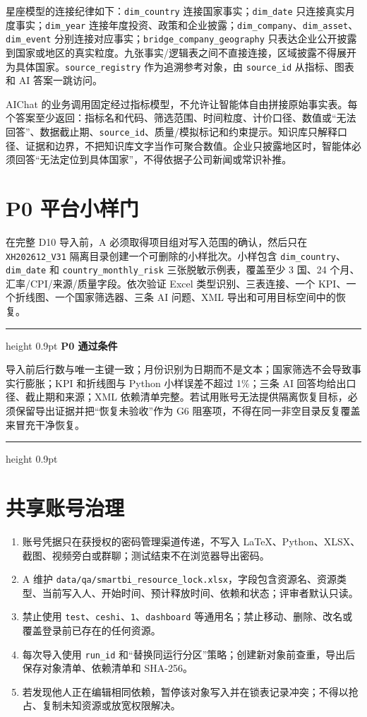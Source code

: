 \documentclass[UTF8,fontset=windows,12pt,openany]{ctexbook}
\newenvironment{gatebox}[1][]{%
  \par\medskip\noindent\begin{center}\begin{minipage}{0.93\textwidth}%
  \color{GoldLine}\hrule height 0.9pt\vspace{0.45em}%
  \textbf{#1}\par\smallskip\color{black}%
}{%
  \par\vspace{0.35em}\color{GoldLine}\hrule height 0.9pt%
  \end{minipage}\end{center}\medskip%
}
\newcommand{\Field}[1]{{\small\nolinkurl{#1}}}
\newcommand{\File}[1]{{\small\nolinkurl{#1}}}
\begin{document}
星座模型的连接纪律如下：\Field{dim_country} 连接国家事实；\Field{dim_date} 只连接真实月度事实；\Field{dim_year} 连接年度投资、政策和企业披露；\Field{dim_company}、\Field{dim_asset}、\Field{dim_event} 分别连接对应事实；\Field{bridge_company_geography} 只表达企业公开披露到国家或地区的真实粒度。九张事实/逻辑表之间不直接连接，区域披露不得展开为具体国家。\Field{source_registry} 作为追溯参考对象，由 \Field{source_id} 从指标、图表和 AI 答案一跳访问。

AIChat 的业务调用固定经过指标模型，不允许让智能体自由拼接原始事实表。每个答案至少返回：指标名和代码、筛选范围、时间粒度、计价口径、数值或“无法回答”、数据截止期、\Field{source_id}、质量/模拟标记和约束提示。知识库只解释口径、证据和边界，不把知识库文字当作可聚合数值。企业只披露地区时，智能体必须回答“无法定位到具体国家”，不得依据子公司新闻或常识补推。

\section{P0 平台小样门}

在完整 D10 导入前，A 必须取得项目组对写入范围的确认，然后只在 \Field{XH202612_V31} 隔离目录创建一个可删除的小样批次。小样包含 \Field{dim_country}、\Field{dim_date} 和 \Field{country_monthly_risk} 三张脱敏示例表，覆盖至少 3 国、24 个月、汇率/CPI/来源/质量字段。依次验证 Excel 类型识别、三表连接、一个 KPI、一个折线图、一个国家筛选器、三条 AI 问题、XML 导出和可用目标空间中的恢复。

\begin{gatebox}[P0 通过条件]
导入前后行数与唯一主键一致；月份识别为日期而不是文本；国家筛选不会导致事实行膨胀；KPI 和折线图与 Python 小样误差不超过 1\%；三条 AI 回答均给出口径、截止期和来源；XML 依赖清单完整。若试用账号无法提供隔离恢复目标，必须保留导出证据并把“恢复未验收”作为 G6 阻塞项，不得在同一非空目录反复覆盖来冒充干净恢复。
\end{gatebox}

\section{共享账号治理}

\begin{enumerate}
  \item 账号凭据只在获授权的密码管理渠道传递，不写入 LaTeX、Python、XLSX、截图、视频旁白或群聊；测试结束不在浏览器导出密码。
  \item A 维护 \File{data/qa/smartbi_resource_lock.xlsx}，字段包含资源名、资源类型、当前写入人、开始时间、预计释放时间、依赖和状态；评审者默认只读。
  \item 禁止使用 \Field{test}、\Field{ceshi}、\Field{1}、\Field{dashboard} 等通用名；禁止移动、删除、改名或覆盖登录前已存在的任何资源。
  \item 每次导入使用 \Field{run_id} 和“替换同运行分区”策略；创建新对象前查重，导出后保存对象清单、依赖清单和 SHA-256。
  \item 若发现他人正在编辑相同依赖，暂停该对象写入并在锁表记录冲突；不得以抢占、复制未知资源或放宽权限解决。
\end{enumerate}
\end{document}
